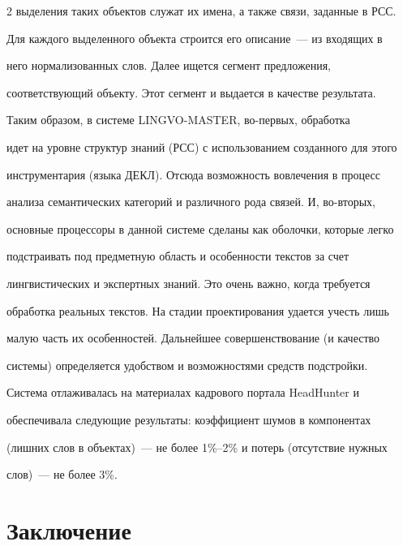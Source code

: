 \begin{multicols}{2}
выделения таких объектов служат их имена, а также связи, заданные в РСС.


Для каждого выделенного объекта строится его описание~--- из входящих в


него нормализованных слов. Далее ищется сегмент предложения,


со\-от\-вет\-ст\-ву\-ющий объекту. Этот сегмент и выдается в качестве результата.





 Таким образом, в системе LINGVO-MASTER, во-пер\-вых, обработка


идет на уровне структур знаний (РСС) с использованием созданного для этого


инструментария (языка ДЕКЛ). Отсюда возможность вовлечения в процесс


анализа семантических категорий и различного рода связей. И, во-вто\-рых,


основные процессоры в данной системе сделаны как оболочки, которые легко


подстраивать под предметную область и особенности текстов за счет


лингвистических и экспертных знаний. Это очень важно, когда требуется


обработка реальных текстов. На стадии проектирования удается учесть лишь


малую часть их особенностей. Дальнейшее совершенствование (и качество


системы) определяется удобством и возможностями средств подстройки.





 Система отлаживалась на материалах кадрового портала HeadHunter и


обеспечивала следующие результаты: коэффициент шумов в компонентах


(лишних слов в объектах)~--- не более 1\%--2\% и потерь (отсутствие нужных


слов)~--- не более 3\%.





\vspace*{-6pt}





\section{Заключение} %






\end{multicols}
